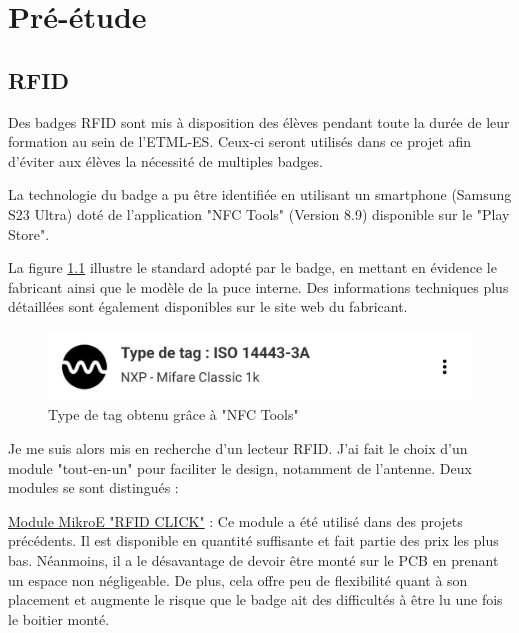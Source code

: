 \cleardoublepage
\chapter{Pré-étude}

\section{RFID}

Des badges RFID sont mis à disposition des élèves pendant toute la durée de leur formation au sein de l'ETML-ES. Ceux-ci seront utilisés dans ce projet afin d'éviter aux élèves la nécessité de multiples badges.

La technologie du badge a pu être identifiée en utilisant un smartphone (Samsung S23 Ultra) doté de l'application "NFC Tools" (Version 8.9) disponible sur le "Play Store".

La figure \ref{fig:screenshotnfctools} illustre le standard adopté par le badge, en mettant en évidence le fabricant ainsi que le modèle de la puce interne. Des informations techniques plus détaillées sont également disponibles sur le site web du fabricant. \cite{MIFAREClassicEV1}

\begin{figure}[h]
	\centering
	\includegraphics[width=0.7\linewidth]{2312_Images/2312_Pre-etude/Screenshot_NFC_Tools}
	\caption{Type de tag obtenu grâce à "NFC Tools"}
	\label{fig:screenshotnfctools}
\end{figure}

Je me suis alors mis en recherche d'un lecteur RFID. J'ai fait le choix d'un module "tout-en-un" pour faciliter le design, notamment de l'antenne. Deux modules se sont distingués : 

\vspace{5pt}
\href{https://www.mikroe.com/rfid-click}{Module MikroE "RFID CLICK"} : Ce module a été utilisé dans des projets précédents. Il est disponible en quantité suffisante et fait partie des prix les plus bas. Néanmoins, il a le désavantage de devoir être monté sur le PCB en prenant un espace non négligeable. De plus, cela offre peu de flexibilité quant à son placement et augmente le risque que le badge ait des difficultés à être lu une fois le boitier monté. 

